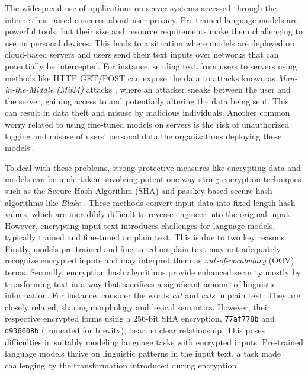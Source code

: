 \documentclass[letterpaper]{article} %
\begin{document}
The widespread use of applications on server systems accessed through the internet has raised concerns about user privacy. Pre-trained language models are powerful tools, but their size and resource requirements make them challenging to use on personal devices. This leads to a situation where models are deployed on cloud-based servers and users send their text inputs over networks that can potentially be intercepted. For instance, sending text from users to servers using methods like HTTP GET/POST can expose the data to attacks known as \textit{Man-in-the-Middle (MitM)} attacks \cite{callegati2009man}, where an attacker sneaks between the user and the server, gaining access to and potentially altering the data being sent. This can result in data theft and misuse by malicious individuals. Another common worry related to using fine-tuned models on servers is the risk of unauthorized logging and misuse of users' personal data the organizations deploying these models \cite{o2003some,jones2005informed}.

To deal with these problems, strong protective measures like encrypting data and models can be undertaken, involving potent one-way string encryption techniques such as the Secure Hash Algorithm (SHA) and passkey-based secure hash algorithms like \emph{Blake} \cite{fernandes2015implementation}. These methods convert input data into fixed-length hash values, which are incredibly difficult to reverse-engineer into the original input. However, encrypting input text introduces challenges for language models, typically trained and fine-tuned on plain text. This is due to two key reasons. Firstly, models pre-trained and fine-tuned on plain text may not adequately recognize encrypted inputs and may interpret them as \emph{out-of-vocabulary} (OOV) terms. Secondly, encryption hash algorithms provide enhanced security mostly by transforming text in a way that sacrifices a significant amount of linguistic information. For instance, consider the words \emph{cat} and \emph{cats} in plain text. They are closely related, sharing morphology and lexical semantics. However, their respective encrypted forms using a 256-bit SHA encryption, \texttt{77af778b} and \texttt{d936608b} (truncated for brevity), bear no clear relationship. This poses difficulties in suitably modeling language tasks with encrypted inputs. Pre-trained language models thrive on linguistic patterns in the input text, a task made challenging by the transformation introduced during encryption.
\end{document}
